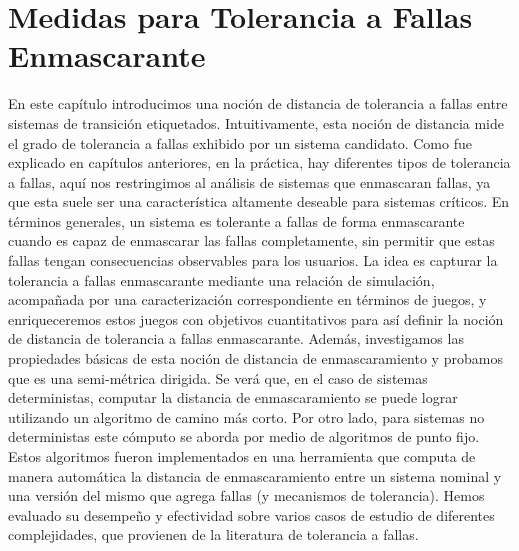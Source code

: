\chapter{Medidas para Tolerancia a Fallas Enmascarante}
\label{cap:maskingMeasure}

En este capítulo introducimos una noción de distancia de tolerancia a fallas entre sistemas de transición etiquetados. Intuitivamente, esta noción de distancia mide el grado de tolerancia a fallas exhibido por un sistema candidato.
Como fue explicado en capítulos anteriores, en la práctica, hay diferentes tipos de tolerancia a fallas, aquí nos restringimos al análisis de sistemas que enmascaran fallas, ya que esta suele ser una característica altamente deseable para sistemas críticos.
En términos generales, un sistema es tolerante a fallas de forma enmascarante cuando es capaz de enmascarar las fallas completamente, sin permitir que estas fallas tengan consecuencias observables para los usuarios.
La idea es capturar la tolerancia a fallas enmascarante mediante una relación de simulación, acompañada por una caracterización correspondiente en términos de juegos,
y enriqueceremos estos juegos con objetivos cuantitativos para así definir la noción de distancia de tolerancia a fallas enmascarante.
Además, investigamos las propiedades básicas de esta noción de distancia de enmascaramiento y probamos que es una semi-métrica dirigida.
Se verá que, en el caso de sistemas deterministas, computar la distancia de enmascaramiento se puede lograr utilizando un algoritmo de camino más corto.
Por otro lado, para sistemas no deterministas este cómputo se aborda por medio de algoritmos de punto fijo.
Estos algoritmos fueron implementados en una herramienta que computa de manera automática la distancia de enmascaramiento entre un sistema nominal y una versión del mismo que agrega fallas (y mecanismos de tolerancia). Hemos evaluado su desempeño y efectividad sobre varios casos de estudio de diferentes complejidades, que provienen de la literatura de tolerancia a fallas.







%









